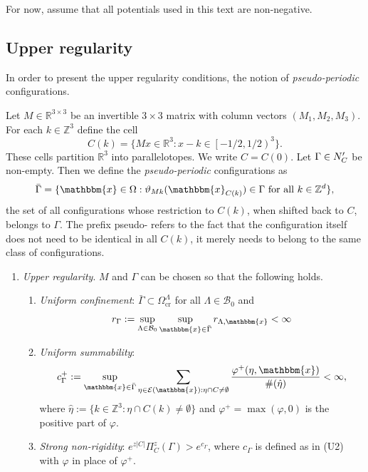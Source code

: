 \documentclass[12pt,a4paper]{article}
\newcommand{\R}{{\mathbb R^3}}
\theoremstyle{definition}
\theoremstyle{remark}
\theoremstyle{theorem}
\newcommand{\x}{\mathbbm{x}}
\begin{document}

For now, assume that all potentials used in this text are non-negative.

\subsection{Upper regularity}

In order to present the upper regularity conditions, the notion of \textit{pseudo-periodic} configurations. 

Let $M\in\mathbb R^{3\times 3}$ be an invertible $3\times 3$ matrix with column vectors $(M_1,M_2,M_3)$. For each $k \in \mathbb Z^3$ define the cell
$$C(k) =  \{Mx \in \R: x-k \in \left[ -1/2, 1/2 \right)^3 \}.$$
These cells partition $\R$ into parallelotopes. We write $C=C(0)$. Let $\Gamma \in \mathcal \mathcal N'_C$ be non-empty. Then we define the \textit{pseudo-periodic} configurations as
$$\bar \Gamma = \{ \x \in \Omega: \vartheta_{Mk}(\x_{C(k)}) \in \Gamma \text{ for all } k \in \mathbb Z^d \},$$
the set of all configurations whose restriction to $C(k)$, when shifted back to $C$, belongs to $\Gamma$. The prefix pseudo- refers to the fact that the configuration itself does not need to be identical in all $C(k)$, it merely needs to belong to the same class of configurations.

\begin{enumerate}[\textbf{(U)}] 
	\item \textit{Upper regularity}. $M$ and $\Gamma$ can be chosen so that the following holds. 
		\begin{enumerate}[(U1)]
			\item \textit{Uniform confinement}: $\bar \Gamma \subset \Omega^\Lambda_\text{cr}$ for all $\Lambda \in \mathcal B_0$ and 
			$$r_\Gamma := \sup_{\Lambda\in\mathcal B_0}\sup_{\x \in \bar\Gamma} r_{\Lambda, \x} < \infty$$
			\item \textit{Uniform summability}: 
			$$c^+_\Gamma := \sup_{\x \in \bar\Gamma}  \sum_{\eta \in \mathcal E(\x): \eta \cap C \neq \emptyset} \frac{\varphi^+(\eta,\x)}{\#(\hat\eta)} < \infty,$$
where $\hat\eta := \{k \in \mathbb Z^3: \eta \cap C(k) \neq \emptyset\}$ and $\varphi^+ = \max(\varphi,0)$ is the positive part of $\varphi$.
\item \textit{Strong non-rigidity}: $e^{z|C|} \Pi^z_C(\Gamma) > e^{c_\Gamma}$, where $c_\Gamma$ is defined as in (U2) with $\varphi$ in place of $\varphi^+$.
		\end{enumerate}
\end{enumerate}
\end{document}
